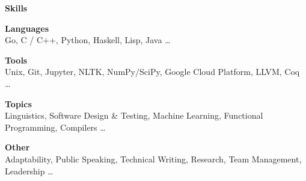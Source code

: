\documentclass[11pt,a4paper,sans]{article}
\newcommand{\cvcolor}[1]{{\color{MidnightBlue}#1}}
\renewcommand{\section}[1]{
  \cvcolor{\noindent \textbf{\LARGE #1}}
  \vspace{.5em}\\
}
\renewcommand{\subsection}[1]{
  \cvcolor{\noindent \textbf{\large #1} \dotfill}
  \\
}
\begin{document}
\section{Skills}
\vspace{-2.5em}
\begin{multicols}{2}
  \subsection{Languages}
  Go, C / C++, Python, Haskell, Lisp, Java \ldots

  \subsection{Tools}
  Unix, Git, Jupyter, NLTK, NumPy/SciPy, Google Cloud Platform, LLVM,
  Coq \ldots

  \vfill\null
  \columnbreak

  \subsection{Topics}
  Linguistics, Software Design \& Testing,
  Machine Learning, Functional Programming, Compilers \ldots

  \subsection{Other}
  Adaptability, Public Speaking, Technical Writing, Research, Team Management,
  Leadership \ldots

\end{multicols}

\vspace{-0.5em}
\end{document}
